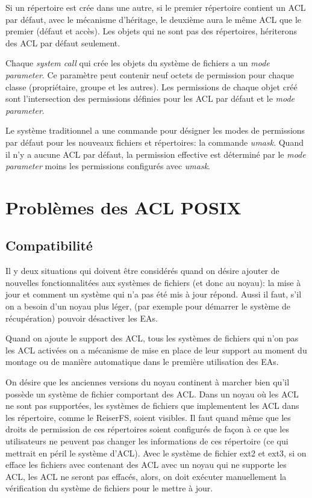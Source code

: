 \documentclass{article}
\begin{document}
Si un répertoire est crée dans une autre, si le premier répertoire contient un ACL par défaut, avec le mécanisme d'héritage, le deuxième aura le même ACL que le premier (défaut et accès). Les objets qui ne sont pas des répertoires, hériterons des ACL par défaut seulement.
 
Chaque \emph{system call} qui crée les objets du système de fichiers a un \emph{mode parameter}. Ce paramètre peut contenir neuf octets de permission pour chaque classe (propriétaire, groupe et les autres). Les permissions de chaque objet créé sont l'intersection des permissions définies pour les ACL par défaut et le \emph{mode parameter}.
 
Le système traditionnel a une commande pour désigner les modes de permissions par défaut pour les nouveaux fichiers et répertoires: la commande \emph{umask}. Quand il n'y a aucune ACL par défaut, la permission effective est déterminé par le \emph{mode parameter} moins les permissions configurés avec \emph{umask}.

\section{Problèmes des ACL POSIX}

\subsection{Compatibilité}

Il y deux situations qui doivent être considérés quand on désire ajouter de nouvelles fonctionnalitées aux systèmes de fichiers (et donc au noyau): la mise à jour et comment un système qui n'a pas été mis à jour répond.
Aussi il faut, s'il on a besoin d'un noyau plus léger, (par exemple pour démarrer le système de récupération) pouvoir désactiver les EAs. 

Quand on ajoute le support des ACL, tous les systèmes de fichiers qui n'on pas les ACL activées on a mécanisme de mise en place de leur support au moment du montage ou de manière automatique dans le première utilisation des EAs. 

On désire que les anciennes versions du noyau continent à marcher bien qu'il possède un système de fichier comportant des ACL. Dans un noyau où les ACL ne sont pas supportées, les systèmes de fichiers que implementent les ACL dans les répertoire, comme le ReiserFS, soient visibles. Il faut quand même que les droits de permission de ces répertoires soient configurés de façon à ce que les utilisateurs ne peuvent pas changer les informations de ces répertoire (ce qui mettrait en péril le système d'ACL). Avec le système de fichier ext2 et ext3, si on efface les fichiers avec contenant des ACL avec un noyau qui ne supporte les ACL, les ACL ne seront pas effacés, alors, on doit exécuter manuellement la vérification du système de fichiers pour le mettre à jour. 
 	
\end{document}
